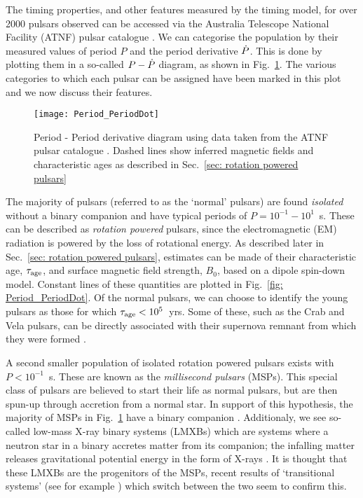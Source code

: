The timing properties, and other features measured by the timing model, for
over 2000 pulsars observed can be accessed via the Australia Telescope National
Facility (ATNF) pulsar catalogue \citep{ATNF}.  We can categorise the
population by their measured values of period $P$ and the period derivative
$\dot{P}$. This is done by plotting them in a so-called $P - \dot{P}$ diagram, as
shown in Fig.~\ref{fig: Period_PeriodDot}.  The various categories to which
each pulsar can be assigned have been marked in this plot and we now discuss
their features.

\begin{figure}[htb]
\centering
\texttt{[image: Period\_PeriodDot]} 
\caption{Period -
Period derivative diagram using data taken from the ATNF pulsar catalogue
\citep{ATNF}. Dashed lines show inferred magnetic fields and characteristic
ages as described in Sec.~\ref{sec: rotation powered pulsars}}
\label{fig: Period_PeriodDot}
\end{figure}

The majority of pulsars (referred to as the `normal' pulsars) are found
\emph{isolated} without a binary companion and have typical periods of
$P=10^{-1}-10^{1}$~s. These can be described as \emph{rotation powered}
pulsars, since the electromagnetic (EM) radiation is powered by the loss of
rotational energy. As described later in Sec.~\ref{sec: rotation powered
pulsars}, estimates can be made of their characteristic age, $\tau_{\mathrm{age}}$, and
surface magnetic field strength, $B_{0}$, based on a dipole spin-down model.
Constant lines of these quantities are plotted in Fig.~\ref{fig:
Period_PeriodDot}. Of the normal pulsars, we can choose to identify the young
pulsars as those for which $\tau_{\mathrm{age}}<10^{5}$~yrs. Some of these, such as the
Crab and Vela pulsars, can be directly associated with their supernova remnant
from which they were formed \citep{Kaspi1996}.

A second smaller population of isolated rotation powered pulsars exists with
$P<10^{-1}$~s. These are known as the \emph{millisecond pulsars} (MSPs). This
special class of pulsars are believed to start their life as normal pulsars,
but are then spun-up through accretion from a normal star. In support of this
hypothesis, the majority of MSPs in Fig.~\ref{fig: Period_PeriodDot} have a
binary companion \citep{wijnands1998millisecond}. Additionaly, we see so-called
low-mass X-ray binary systems (LMXBs) which are systems where a neutron star in
a binary accretes matter from its companion; the infalling matter releases
gravitational potential energy in the form of X-rays \citep{lewin1997x}. It is
thought that these LMXBs are the progenitors of the MSPs, recent results of
`transitional systems' (see for example \citep{archibald2009radio}) which
switch between the two seem to confirm this.

